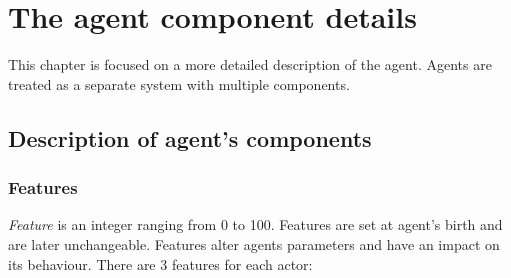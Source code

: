 \chapter{The agent component details}
\label{agentsChapter}
This chapter is focused on a more detailed description of the agent. Agents are treated as a separate system with multiple components.

\section{Description of agent's components}
\subsection{Features}
\label{featuresDefinition}
\emph{Feature} is an integer ranging from 0 to 100. Features are set at agent's birth and are later unchangeable. Features alter agents parameters and have an impact on its behaviour. There are 3 features for each actor:
